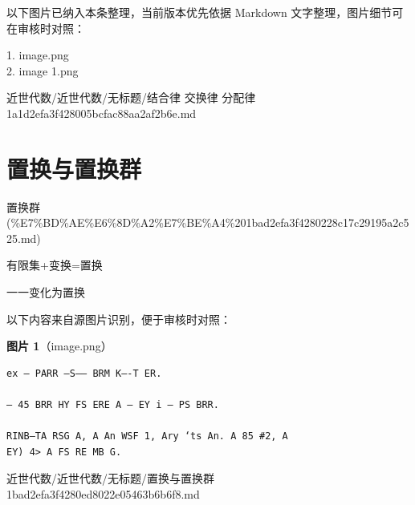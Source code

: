 \begin{note}[关联图片]
以下图片已纳入本条整理，当前版本优先依据 Markdown 文字整理，图片细节可在审核时对照：

1. image.png\\
2. image 1.png\\

\end{note}

\begin{note}[来源路径]

近世代数/近世代数/无标题/结合律 交换律 分配律 1a1d2efa3f428005bcfac88aa2af2b6e.md

\end{note}

\section*{置换与置换群}

\begin{note}[来源上级主题]

置换群 (\%E7\%BD\%AE\%E6\%8D\%A2\%E7\%BE\%A4\%201bad2efa3f4280228c17c29195a2c525.md)

\end{note}

\begin{note}[置换与置换群]

有限集+变换=置换

一一变化为置换

\end{note}

\begin{note}
以下内容来自源图片识别，便于审核时对照：

\textbf{图片 1}（image.png）
\begin{Verbatim}[fontsize=\small]
ex — PARR —S—— BRM K—-T ER.

— 45 BRR HY FS ERE A — EY i — PS BRR.

RINB—TA RSG A, A An WSF 1, Ary ‘ts An. A 85 #2, A
EY) 4> A FS RE MB G.
\end{Verbatim}

\end{note}

\begin{note}[来源路径]

近世代数/近世代数/无标题/置换与置换群 1bad2efa3f4280ed8022e05463b6b6f8.md

\end{note}

